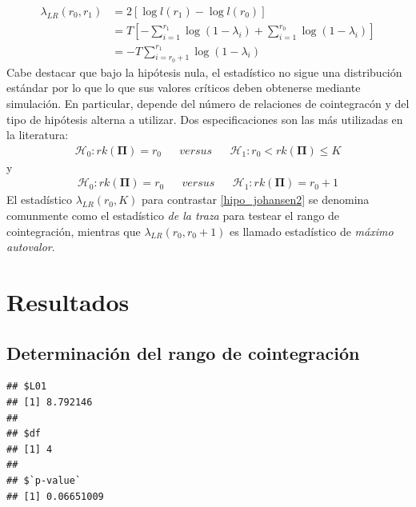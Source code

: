 \documentclass[12pt, twoside]{book}\usepackage[]{graphicx}\usepackage[]{color}
\makeatletter
\newenvironment{kframe}{%
 \def\at@end@of@kframe{}%
 \ifinner\ifhmode%
  \def\at@end@of@kframe{\end{minipage}}%
  \begin{minipage}{\columnwidth}%
 \fi\fi%
 \def\FrameCommand##1{\hskip\@totalleftmargin \hskip-\fboxsep
 \colorbox{shadecolor}{##1}\hskip-\fboxsep
     \hskip-\linewidth \hskip-\@totalleftmargin \hskip\columnwidth}%
 \MakeFramed {\advance\hsize-\width
   \@totalleftmargin\z@ \linewidth\hsize
   \@setminipage}}%
 {\par\unskip\endMakeFramed%
 \at@end@of@kframe}
\newenvironment{knitrout}{}{} %
\let\bold\boldsymbol
\numberwithin{equation}{section}
\numberwithin{theorem}{section}
\numberwithin{teorema}{section}
\numberwithin{defi}{section}
\numberwithin{prop}{section}
\numberwithin{defi}{section}
\theoremstyle{plain}
\makeatother
\begin{document}
\begin{align}
\lambda_{LR}(r_{0},r_{1}) & = 2[\log l(r_{1})-\log l(r_{0})] \nonumber \\ 
                          & = T\left[-\sum_{i=1}^{r_{1}}\log(1-\lambda_{i})+\sum_{i=1}^{r_{0}}\log(1-\lambda_{i})\right] \nonumber \\ 
                          & = -T\sum_{i=r_{0}+1}^{r_{1}}\log (1-\lambda_{i})
\end{align}
Cabe destacar que bajo la hipótesis nula, el estadístico no sigue una distribución estándar por lo que lo que sus valores críticos deben obtenerse mediante simulación. En particular, depende del número de relaciones de cointegracón y del tipo de hipótesis alterna a utilizar. Dos especificaciones son las más utilizadas en la literatura: 
\begin{align}
\mathcal{H}_{0}: rk(\bold{\Pi})=r_{0} &&  versus && \mathcal{H}_{1}: r_{0}<rk(\bold{\Pi})\leq K \label{hipo_johansen2}
\end{align}
y
\begin{align}
\mathcal{H}_{0}: rk(\bold{\Pi})=r_{0} &&  versus && \mathcal{H}_{1}: rk(\bold{\Pi})=r_{0}+1 \label{hipo_johansen3}
\end{align}
El estadístico $\lambda_{LR}(r_{0},K)$ para contrastar \eqref{hipo_johansen2} se denomina comunmente como el estadístico \textit{de la traza} para testear el rango de cointegración, mientras que $\lambda_{LR}(r_{0},r_{0}+1)$ es llamado estadístico de \textit{máximo autovalor}.  

\section{Resultados}
\subsection{Determinación del rango de cointegración}



\begin{knitrout}\scriptsize
{}\color{fgcolor}\begin{kframe}
\begin{verbatim}
## $L01
## [1] 8.792146
## 
## $df
## [1] 4
## 
## $`p-value`
## [1] 0.06651009
\end{verbatim}
\end{kframe}
\end{knitrout}
\end{document}
